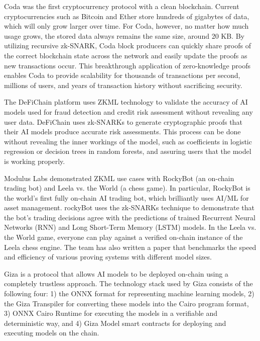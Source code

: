 \documentclass[journal]{IEEEtran}
\begin{document}
Coda \cite{bonneau2020coda} was the first cryptocurrency protocol with a clean blockchain. Current cryptocurrencies such as Bitcoin and Ether store hundreds of gigabytes of data, which will only grow larger over time. For Coda, however, no matter how much usage grows, the stored data always remains the same size, around 20 KB. By utilizing recursive zk-SNARK, Coda block producers can quickly share proofs of the correct blockchain state across the network and easily update the proofs as new transactions occur. This breakthrough application of zero-knowledge proofs enables Coda to provide scalability for thousands of transactions per second, millions of users, and years of transaction history without sacrificing security.

The DeFiChain\cite{DeFiChain} platform uses ZKML technology to validate the accuracy of AI models used for fraud detection and credit risk assessment without revealing any user data. DeFiChain uses zk-SNARKs to generate cryptographic proofs that their AI models produce accurate risk assessments. This process can be done without revealing the inner workings of the model, such as coefficients in logistic regression or decision trees in random forests, and assuring users that the model is working properly.

Modulus Labs\cite{ModulusXYZ} demonstrated ZKML use cases with RockyBot (an on-chain trading bot) and Leela vs. the World (a chess game). In particular, RockyBot is the world's first fully on-chain AI trading bot, which brilliantly uses AI/ML for asset management. rockyBot uses the zk-SNARKs technique to demonstrate that the bot's trading decisions agree with the predictions of trained Recurrent Neural Networks (RNN) and Long Short-Term Memory (LSTM) models. In the Leela vs. the World game, everyone can play against a verified on-chain instance of the Leela chess engine. The team has also written a paper \cite{moduluslabs2023cost} that benchmarks the speed and efficiency of various proving systems with different model sizes.

Giza \cite{Giza} is a protocol that allows AI models to be deployed on-chain using a completely trustless approach. The technology stack used by Giza consists of the following four: 1) the ONNX format for representing machine learning models, 2) the Giza Transpiler for converting these models into the Cairo program format, 3) ONNX Cairo Runtime for executing the models in a verifiable and deterministic way, and 4) Giza Model smart contracts for deploying and executing models on the chain.
\end{document}
